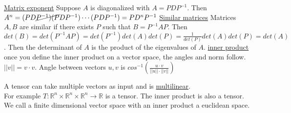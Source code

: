 \documentclass{beamer}
\theoremstyle{definition}
\renewcommand{\=}{&=&}
\newcommand{\<}{\langle}
\renewcommand{\>}{\rangle}
\begin{document}
\begin{frame}[t]


\underline{Matrix exponent}
Suppose $A$ is diagonalized with $A=PDP^{-1}$.
Then $A^n = (PD\cancel{P^{-1})(P}DP^{-1})\cdots(PDP^{-1}) = PD^nP^{-1}$
\underline{Similar matrices} Matrices $A, B$ are similar if there exists $P$
such that $B = P^{-1}AP$. Then $det(B) = det(P^{-1}AP) = det(P^{-1})det(A)det(P)
= \frac{1}{det(P)}det(A) det(P) = det(A)$. Then the determinant of $A$ is the
product of the eigenvalues of $A$.  
\underline{inner product}
once you define the inner product on a vector space, the angles and norm
follow. $||v|| = v \cdot v$. Angle between vectors $u, v$ is $cos^{-1}(\frac{u \cdot v}{||u|| \cdot ||v||})$

\end{frame}
\begin{frame}[t]
A tensor can take multiple vectors as input and is
\href{https://en.wikipedia.org/wiki/Multilinear_map}{multilinear}. \\
 For example $T: \mathbb{R}^n \times \mathbb{R}^n \times
\mathbb{R}^n \rightarrow \mathbb{R}$ is a tensor. The inner product is also a tensor.\\

We call a finite dimensional vector space with an inner product a euclidean
space.

\end{frame}
\end{document}
